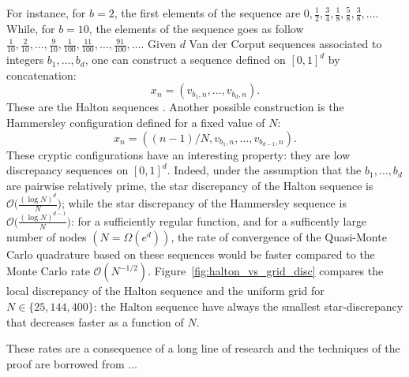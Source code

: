\documentclass[twoside,11pt]{book}
\newtheorem{definition}{Definition}
\begin{document}

For instance, for $b = 2$, the first elements of the sequence are $\displaystyle 0, \frac{1}{2}, \frac{3}{4}, \frac{1}{8}, \frac{5}{8}, \frac{3}{8}, \dots$. While, for $b=10$, the elements of the sequence goes as follow $\displaystyle \frac{1}{10}, \frac{2}{10}, \dots, \frac{9}{10}, \frac{1}{100}, \frac{11}{100}, \dots ,\frac{91}{100}, \dots$.
Given $d$ Van der Corput sequences associated to integers $b_{1}, \dots , b_{d}$, one can construct a sequence defined on $[0,1]^{d}$ by concatenation:
\begin{equation}
x_{n} = (v_{b_1,n}, \dots, v_{b_d,n}).
\end{equation}
These are the Halton sequences \citep{Hal64}. Another possible construction is the Hammersley configuration defined for a fixed value of $N$:
\begin{equation}
x_{n} = ((n-1)/N,v_{b_1,n}, \dots, v_{b_{d-1},n}).
\end{equation}
These cryptic configurations have an interesting property: they are low discrepancy sequences on $[0,1]^{d}$. Indeed, under the assumption that the $b_{1}, \dots, b_{d}$ are pairwise relatively prime, the star discrepancy of the Halton sequence is $\displaystyle \mathcal{O}\bigg(\frac{(\log N)^{d}}{N} \bigg)$; while the star discrepancy of the Hammersley sequence is $\displaystyle \mathcal{O} \bigg(\frac{(\log N)^{d-1}}{N} \bigg)$: for a sufficiently regular function, and for a sufficently large number of nodes $(N = \Omega(e^{d}))$, the rate of convergence of the Quasi-Monte Carlo quadrature based on these sequences would be faster compared to the Monte Carlo rate $\mathcal{O}(N^{-1/2})$. Figure~\ref{fig:halton_vs_grid_disc} compares the local discrepancy of the Halton sequence and the uniform grid for $N \in \{25,144,400\}$: the Halton sequence have always the smallest star-discrepancy that decreases faster as a function of $N$. 



These rates are a consequence of a long line of research and the techniques of the proof are borrowed from ...




\end{document}
